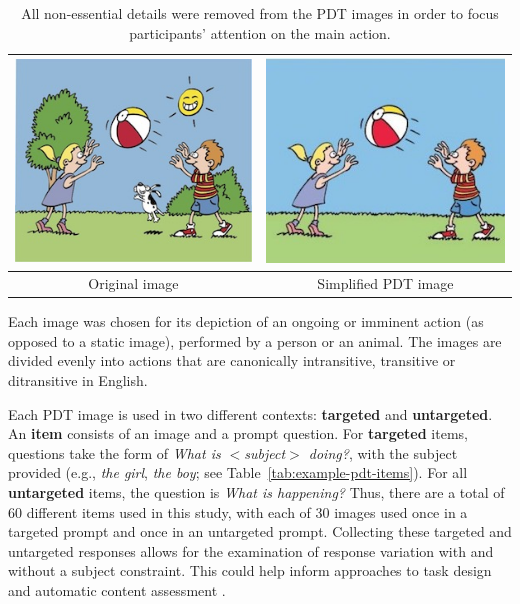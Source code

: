 \begin{table}[htb!]
\begin{center}
\begin{tabular}{|c|c|}
\hline
{\includegraphics[width=0.38\columnwidth]{figures/throw-original.jpg}} & {\includegraphics[width=0.38\columnwidth]{figures/I21cropped.jpg}} \\
\hline
Original image & Simplified PDT image \\
\hline
\end{tabular}
\caption{\label{tab:image-prep} All non-essential details were removed from the PDT images in order to focus participants' attention on the main action.}
\end{center}
\end{table}

Each image was chosen for its depiction of an ongoing or imminent action (as opposed to a static image), performed by a person or an animal. The images are divided evenly into actions that are canonically intransitive, transitive or ditransitive in English.

Each PDT image is used in two different contexts: \textbf{targeted} and \textbf{untargeted}. An \textbf{item} consists of an image and a prompt question. For \textbf{targeted} items, questions take the form of \textit{What is $<$subject$>$ doing?}, with the subject provided (e.g., \textit{the girl}, \textit{the boy}; see Table~\ref{tab:example-pdt-items}). For all \textbf{untargeted} items, the question is \textit{What is happening?} Thus, there are a total of 60 different items used in this study, with each of 30 images used once in a targeted prompt and once in an untargeted prompt. Collecting these targeted and untargeted responses allows for the examination of response variation with and without a subject constraint. This could help inform approaches to task design and automatic content assessment \citep{foster2009native, cho2013investigating}. 

